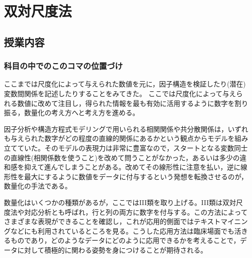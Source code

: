 \section{双対尺度法}
\subsection{授業内容}
\subsubsection{科目の中でのこのコマの位置づけ}
ここまでは尺度化によって与えられた数値を元に，因子構造を検証したり(潜在)変数間関係を記述したりすることをみてきた。
ここでは尺度化によって与えられる数値に改めて注目し，得られた情報を最も有効に活用するように数字を割り振る，数量化の考え方へと考え方を進める。

因子分析や構造方程式モデリングで用いられる相関関係や共分散関係は，いずれも与えられた数字がどの程度の直線的関係にあるかという観点からモデルを組み立てていた。そのモデルの表現力は非常に豊富なので，スタートとなる変数同士の直線性(相関係数を使うこと)を改めて問うことがなかった，あるいは多少の違和感を抑えて進んでしまうことがある。改めてその線形性に注意を払い，逆に線形性を最大にするように数値をデータに付与するという発想を転換させるのが，数量化の手法である。

数量化はいくつかの種類があるが，ここではIII類を取り上げる。III類は双対尺度法や対応分析とも呼ばれ，行と列の両方に数字を付与する。この方法によってさまざまな表現ができることを確認し，これが応用的側面ではテキストマイニングなどにも利用されているところを見る。こうした応用方法は臨床場面でも活きるものであり，どのようなデータにどのように応用できるかを考えることで，データに対して積極的に関わる姿勢を身につけることが期待される。

